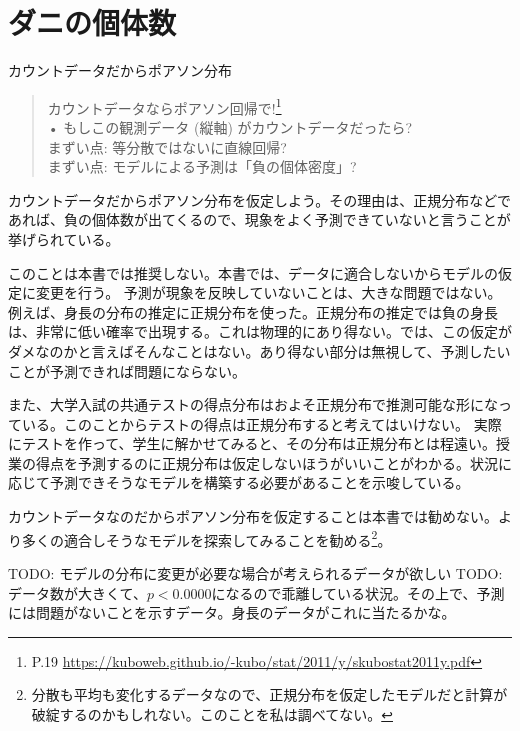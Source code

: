 \section{ダニの個体数}
\begin{SMbox}{カウントデータだからポアソン分布}
    \begin{quote}
        カウントデータならポアソン回帰で!\footnote{P.19 \url{https://kuboweb.github.io/-kubo/stat/2011/y/skubostat2011y.pdf}}\\
        • もしこの観測データ (縦軸) がカウントデータだったら?\\
        まずい点: 等分散ではないに直線回帰?\\
        まずい点: モデルによる予測は「負の個体密度」?\\
    \end{quote}
    カウントデータだからポアソン分布を仮定しよう。その理由は、正規分布などであれば、負の個体数が出てくるので、現象をよく予測できていないと言うことが挙げられている。

    このことは本書では推奨しない。本書では、データに適合しないからモデルの仮定に変更を行う。
    予測が現象を反映していないことは、大きな問題ではない。例えば、身長の分布の推定に正規分布を使った。正規分布の推定では負の身長は、非常に低い確率で出現する。これは物理的にあり得ない。では、この仮定がダメなのかと言えばそんなことはない。あり得ない部分は無視して、予測したいことが予測できれば問題にならない。

    また、大学入試の共通テストの得点分布はおよそ正規分布で推測可能な形になっている。このことからテストの得点は正規分布すると考えてはいけない。
    実際にテストを作って、学生に解かせてみると、その分布は正規分布とは程遠い。授業の得点を予測するのに正規分布は仮定しないほうがいいことがわかる。状況に応じて予測できそうなモデルを構築する必要があることを示唆している。

    カウントデータなのだからポアソン分布を仮定することは本書では勧めない。より多くの適合しそうなモデルを探索してみることを勧める\footnote{分散も平均も変化するデータなので、正規分布を仮定したモデルだと計算が破綻するのかもしれない。このことを私は調べてない。}。
\end{SMbox}

TODO: モデルの分布に変更が必要な場合が考えられるデータが欲しい
TODO: データ数が大きくて、$p<0.0000$になるので乖離している状況。その上で、予測には問題がないことを示すデータ。身長のデータがこれに当たるかな。
\fi

